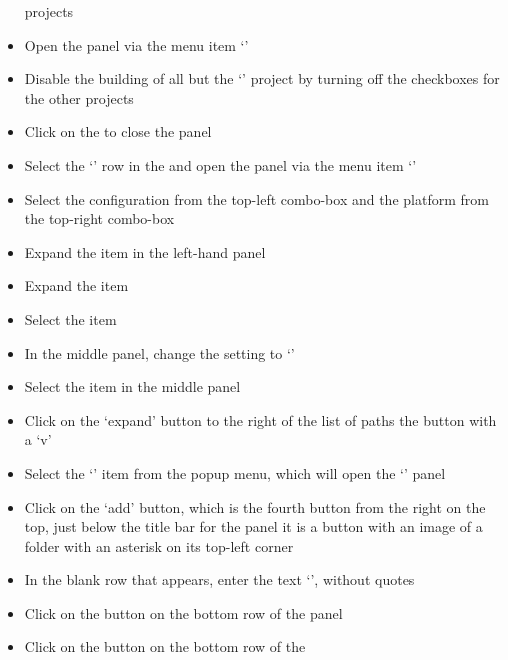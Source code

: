 \begin{itemize}
projects
\item\exSp{}Open the  panel via the menu item
`'
\item\exSp{}Disable the building of all but the `' project by turning
off the  checkboxes for the other projects
\item\exSp{}Click on the  to close the  panel
\item\exSp{}Select the `' row in the  and
open the  panel via the menu item
`'
\item\exSp{}Select the  configuration from the top-left
combo-box and the  platform from the top-right combo-box
\item\exSp{}Expand the  item in the left-hand panel
\item\exSp{}Expand the  item
\item\exSp{}Select the  item
\item\exSp{}In the middle panel, change the  setting to
`'
\item\exSp{}Select the  item in the middle panel
\item\exSp{}Click on the `expand' button to the right of the list of paths \longDash{} the
button with a `v'
\item\exSp{}Select the `' item from the popup menu, which
will open the `' panel
\item\exSp{}Click on the `add' button, which is the fourth button from the right on the
top, just below the title bar for the panel \longDash{} it is a button with an image of a
folder with an asterisk on its top-left corner
\item\exSp{}In the blank row that appears, enter the text
`',
without quotes
\item\exSp{}Click on the  button on the bottom row of the
 panel
\item\exSp{}Click on the  button on the bottom row of the

\end{itemize}
